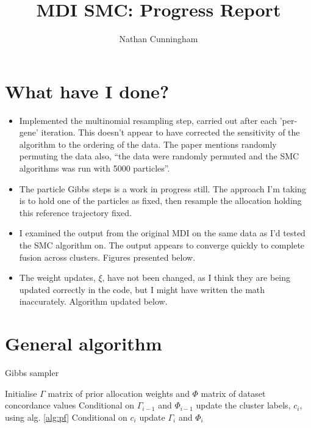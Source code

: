 \documentclass[10pt,a4paper]{article}
\author{Nathan Cunningham}
\title{MDI SMC: Progress Report}
\begin{document}
\maketitle


\section{What have I done?}
\begin{itemize}
\item Implemented the multinomial resampling step, carried out after each 'per-gene' iteration. This doesn't appear to have corrected the sensitivity of the algorithm to the ordering of the data. The \citeauthor{griffin2014sequential} \cite{griffin2014sequential} paper mentions randomly permuting the data also, ``the data were randomly permuted and the SMC algorithms was run with 5000 particles''.
\item The particle Gibbs steps is a work in progress still. The approach I'm taking is to hold one of the particles as fixed, then resample the allocation holding this reference trajectory fixed.
\item I examined the output from the original MDI on the same data as I'd tested the SMC algorithm  on. The output appears to converge quickly to complete fusion across clusters. Figures presented below.
 \item The weight updates, $\xi$, have not been changed, as I think they are being updated correctly in the code, but I might have written the math inaccurately. Algorithm updated below.
\end{itemize}




\section*{General algorithm}
\begin{algorithm}
\caption{Gibbs sampler}
 \begin{algorithmic}[1]
  \State Initialise $\Gamma$ matrix of prior allocation weights and $\Phi$ matrix of dataset concordance values
  \State Conditional on $\Gamma_{i-1}$ and $\Phi_{i-1}$ update the cluster labels, $c_{i}$, using alg. \ref{alg:pf}
  \State Conditional on $c_{i}$ update $\Gamma_i$ and $\Phi_i$
  \EndFor
\end{algorithmic}
\end{algorithm}
\end{document}
